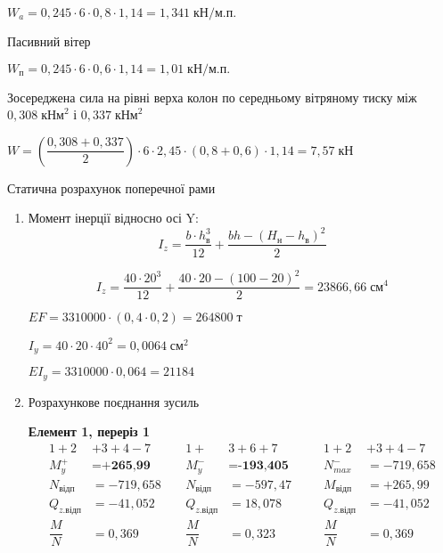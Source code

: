 \documentclass[a4paper,14pt]{article}
\begin{document}
$W_\textit{a}= 0,245 \cdot 6\cdot 0,8\cdot 1,14 = 1,341\;\textit{кН/м.п.}$   

Пасивний вітер

$W_\textit{п}= 0,245 \cdot 6\cdot 0,6\cdot 1,14 = 1,01\;\textit{кН/м.п.}$ 

Зосереджена сила на рівні верха колон по середньому вітряному тиску між $0,308\;\textit{кНм}^2$ і $0,337\;\textit{кНм}^2$

$W = \left(\dfrac{0,308+0,337}{2}\right)\cdot 6 \cdot 2,45 \cdot (0,8+0,6)\cdot 1,14 = 7,57\;\textit{кН}$ 


Статична розрахунок поперечної рами 

\begin{enumerate}
    \item Момент інерції відносно осі Y:
    \begin{equation}
        I_z = \dfrac{b\cdot h^3_\textit{в}}{12}+\dfrac{bh-(H_\textit{н}-h_\textit{в})^2}{2} 
    \end{equation}
    
    $$I_z = \dfrac{40\cdot 20^3}{12}+\dfrac{40\cdot 20-(100-20)^2}{2}=23866,66\;\textit{см}^4$$

    $EF=3310000\cdot (0,4\cdot 0,2) = 264800\;\textit{т}$

    $I_y = 40 \cdot 20\cdot 40^2 = 0,0064\;\textit{см}^2$

    $EI_y = 3310000\cdot 0,064 = 21184$

    \item Розрахункове поєднання зусиль
    
    \textbf{Елемент 1, переріз 1}
    \begin{equation*}
        \begin{aligned}
        1+2&+3+4-7\qquad  &1+&3+6+7 &1+2&+3+4-7\\
        M^+_y &= \textbf{+265,99} &M^-_y &= \textbf{-193,405}\qquad &N^-_{max} &= -719,658\\
        N_\textit{відп} &= -719,658  &N_\textit{відп} &= -597,47 &M_\textit{відп} &= +265,99 \\
        Q_\textit{z.відп} &= -41,052 &Q_\textit{z.відп} &= 18,078 &Q_\textit{z.відп} &= -41,052 \\
        \dfrac{M}{N}&=0,369  &\dfrac{M}{N}&=0,323 &\dfrac{M}{N}&=0,369 
        \end{aligned}
    \end{equation*}
 

\end{enumerate}
\end{document}
